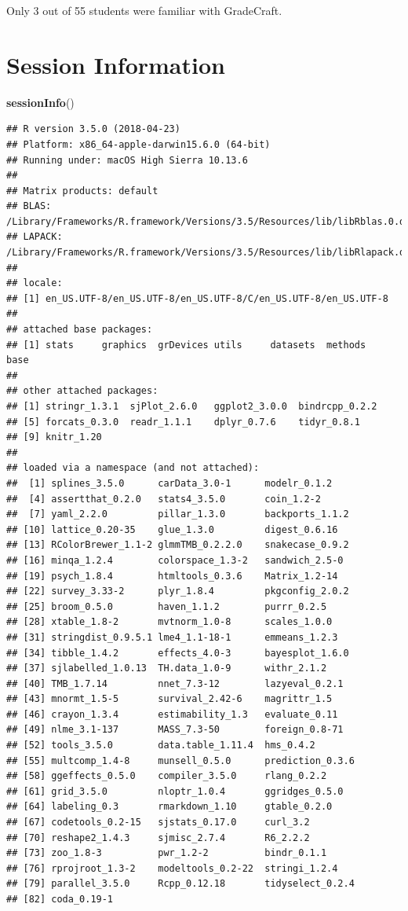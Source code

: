 \documentclass[]{article}
\newenvironment{Shaded}{\begin{snugshade}}{\end{snugshade}}
\newcommand{\KeywordTok}[1]{\textcolor[rgb]{0.13,0.29,0.53}{\textbf{#1}}}
\newcommand{\NormalTok}[1]{#1}
\begin{document}
Only 3 out of 55 students were familiar with GradeCraft.

\section{Session Information}\label{session-information}

\begin{Shaded}
\begin{Highlighting}[]
\KeywordTok{sessionInfo}\NormalTok{()}
\end{Highlighting}
\end{Shaded}

\begin{verbatim}
## R version 3.5.0 (2018-04-23)
## Platform: x86_64-apple-darwin15.6.0 (64-bit)
## Running under: macOS High Sierra 10.13.6
## 
## Matrix products: default
## BLAS: /Library/Frameworks/R.framework/Versions/3.5/Resources/lib/libRblas.0.dylib
## LAPACK: /Library/Frameworks/R.framework/Versions/3.5/Resources/lib/libRlapack.dylib
## 
## locale:
## [1] en_US.UTF-8/en_US.UTF-8/en_US.UTF-8/C/en_US.UTF-8/en_US.UTF-8
## 
## attached base packages:
## [1] stats     graphics  grDevices utils     datasets  methods   base     
## 
## other attached packages:
## [1] stringr_1.3.1  sjPlot_2.6.0   ggplot2_3.0.0  bindrcpp_0.2.2
## [5] forcats_0.3.0  readr_1.1.1    dplyr_0.7.6    tidyr_0.8.1   
## [9] knitr_1.20    
## 
## loaded via a namespace (and not attached):
##  [1] splines_3.5.0      carData_3.0-1      modelr_0.1.2      
##  [4] assertthat_0.2.0   stats4_3.5.0       coin_1.2-2        
##  [7] yaml_2.2.0         pillar_1.3.0       backports_1.1.2   
## [10] lattice_0.20-35    glue_1.3.0         digest_0.6.16     
## [13] RColorBrewer_1.1-2 glmmTMB_0.2.2.0    snakecase_0.9.2   
## [16] minqa_1.2.4        colorspace_1.3-2   sandwich_2.5-0    
## [19] psych_1.8.4        htmltools_0.3.6    Matrix_1.2-14     
## [22] survey_3.33-2      plyr_1.8.4         pkgconfig_2.0.2   
## [25] broom_0.5.0        haven_1.1.2        purrr_0.2.5       
## [28] xtable_1.8-2       mvtnorm_1.0-8      scales_1.0.0      
## [31] stringdist_0.9.5.1 lme4_1.1-18-1      emmeans_1.2.3     
## [34] tibble_1.4.2       effects_4.0-3      bayesplot_1.6.0   
## [37] sjlabelled_1.0.13  TH.data_1.0-9      withr_2.1.2       
## [40] TMB_1.7.14         nnet_7.3-12        lazyeval_0.2.1    
## [43] mnormt_1.5-5       survival_2.42-6    magrittr_1.5      
## [46] crayon_1.3.4       estimability_1.3   evaluate_0.11     
## [49] nlme_3.1-137       MASS_7.3-50        foreign_0.8-71    
## [52] tools_3.5.0        data.table_1.11.4  hms_0.4.2         
## [55] multcomp_1.4-8     munsell_0.5.0      prediction_0.3.6  
## [58] ggeffects_0.5.0    compiler_3.5.0     rlang_0.2.2       
## [61] grid_3.5.0         nloptr_1.0.4       ggridges_0.5.0    
## [64] labeling_0.3       rmarkdown_1.10     gtable_0.2.0      
## [67] codetools_0.2-15   sjstats_0.17.0     curl_3.2          
## [70] reshape2_1.4.3     sjmisc_2.7.4       R6_2.2.2          
## [73] zoo_1.8-3          pwr_1.2-2          bindr_0.1.1       
## [76] rprojroot_1.3-2    modeltools_0.2-22  stringi_1.2.4     
## [79] parallel_3.5.0     Rcpp_0.12.18       tidyselect_0.2.4  
## [82] coda_0.19-1
\end{verbatim}
\end{document}
